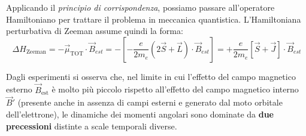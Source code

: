Applicando il \emph{principio di corrispondenza}, possiamo passare all'operatore Hamiltoniano per trattare il problema in meccanica quantistica. L'Hamiltoniana perturbativa di Zeeman assume quindi la forma:
\begin{equation}
    \Delta H_{\text{Zeeman}} = - \vec{\mu}_{\text{TOT}} \cdot \vec{B}_{est} = - \left[ - \frac{e}{2m_e} (2\vec{S} + \vec{L}) \cdot \vec{B}_{est} \right] = + \frac{e}{2m_e} [\vec{S} + \vec{J}] \cdot \vec{B}_{est}
\end{equation}

Dagli esperimenti si osserva che, nel limite in cui l'effetto del campo magnetico esterno \( \vec{B}_{\text{est}} \) è molto più piccolo rispetto all'effetto del campo magnetico interno \( \vec{B}' \) (presente anche in assenza di campi esterni e generato dal moto orbitale dell'elettrone), le dinamiche dei momenti angolari sono dominate da \textbf{due precessioni} distinte a scale temporali diverse.
